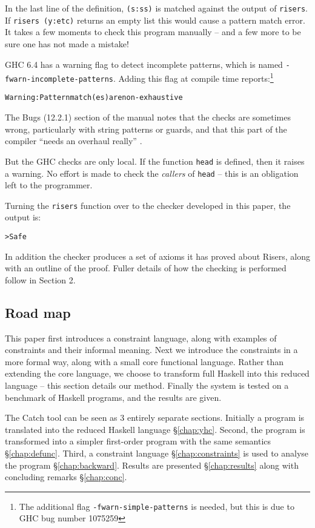 \documentclass[preprint]{sigplanconf}
\newcommand{\T}[1]{\texttt{#1}}
\newenvironment{code}{\begin{alltt}\small}{\end{alltt}}
\begin{document}
In the last line of the definition, \T{(s:ss)} is matched against
the output of \T{risers}. If \T{risers (y:etc)} returns an empty
list this would cause a pattern match error. It takes a few
moments to check this program manually -- and a few more to be
sure one has not made a mistake!

GHC \cite{ghc_manual} 6.4 has a warning flag to detect incomplete
patterns, which is named \T{-fwarn-incomplete-patterns}. Adding
this flag at compile time reports:\footnote{The additional flag
\T{-fwarn-simple-patterns} is needed, but this is due to GHC bug
number 1075259}

\begin{code}
Warning: Pattern match(es) are non-exhaustive
\end{code}

The Bugs (12.2.1) section of the manual notes that the checks are
sometimes wrong, particularly with string patterns or guards, and
that this part of the compiler ``needs an overhaul really''
\cite{ghc_manual}.

But the GHC checks are only local. If the function \T{head} is
defined, then it raises a warning. No effort is made to check the
\textit{callers} of \T{head} -- this is an obligation left to the
programmer.

Turning the \T{risers} function over to the checker developed in
this paper, the output is:

\begin{code}
> Safe
\end{code}

In addition the checker produces a set of axioms it has proved about Risers, along with an outline of the proof. Fuller details of how the checking is performed follow in Section 2.

\subsection{Road map}

This paper first introduces a constraint language, along with examples of
constraints and their informal meaning. Next we introduce the constraints in a
more formal way, along with a small core functional language. Rather than
extending the core language, we choose to transform full Haskell into this
reduced language -- this section details our method. Finally the system is
tested on a benchmark of Haskell programs, and the results are given.

The Catch tool can be seen as 3 entirely separate sections. Initially a program
is translated into the reduced Haskell language \S\ref{chap:yhc}. Second, the
program is transformed into a simpler first-order program with the same
semantics \S\ref{chap:defunc}. Third, a constraint language
\S\ref{chap:constraints} is used to analyse the program \S\ref{chap:backward}.
Results are presented \S\ref{chap:results} along with concluding remarks
\S\ref{chap:conc}.
\end{document}
